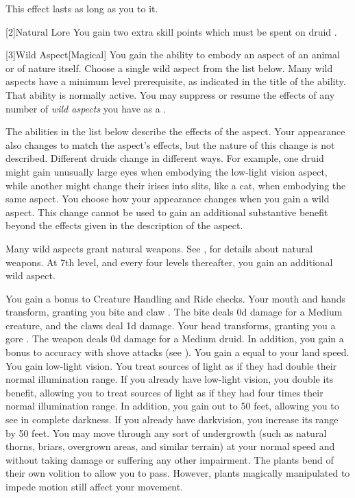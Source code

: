         This effect lasts as long as you  to it.

        [2]{Natural Lore}
        You gain two extra skill points which must be spent on druid .

        [3]{Wild Aspect}[Magical]
        You gain the ability to embody an aspect of an animal or of nature itself.
        Choose a single wild aspect from the list below.
        Many wild aspects have a minimum level prerequisite, as indicated in the title of the ability.
        That ability is normally active.
        You may suppress or resume the effects of any number of \textit{wild aspects} you have as a .

        The abilities in the list below describe the effects of the aspect.
        Your appearance also changes to match the aspect's effects, but the nature of this change is not described.
        Different druids change in different ways.
        For example, one druid might gain unusually large eyes when embodying the low-light vision aspect, while another might change their irises into slits, like a cat, when embodying the same aspect.
        You choose how your appearance changes when you gain a wild aspect.
        This change cannot be used to gain an additional substantive benefit beyond the effects given in the description of the aspect.

        Many wild aspects grant natural weapons.
        See , for details about natural weapons.
        At 7th level, and every four levels thereafter, you gain an additional wild aspect.

        You gain a  bonus to Creature Handling and Ride checks.
        Your mouth and hands transform, granting you bite and claw .
        The bite deals \plus0d damage for a Medium creature, and the claws deal \minus1d damage.
        Your head transforms, granting you a gore .
        The weapon deals \plus0d damage for a Medium druid.
        In addition, you gain a  bonus to accuracy with shove attacks (see ).
        You gain a  equal to your land speed.
        You gain low-light vision.
        You treat sources of light as if they had double their normal illumination range.
        If you already have low-light vision, you double its benefit, allowing you to treat sources of light as if they had four times their normal illumination range.
        In addition, you gain  out to 50 feet, allowing you to see in complete darkness.
        If you already have darkvision, you increase its range by 50 feet.
        You may move through any sort of undergrowth (such as natural thorns, briars, overgrown areas, and similar terrain) at your normal speed and without taking damage or suffering any other impairment.
        The plants bend of their own volition to allow you to pass.
        However, plants magically manipulated to impede motion still affect your movement.

